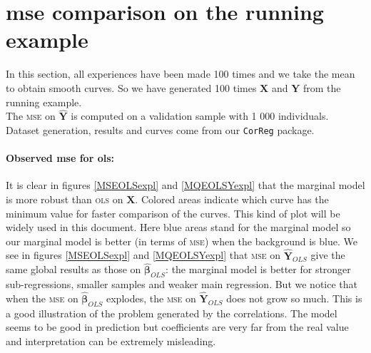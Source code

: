 \documentclass[12pt,a4paper]{report}
\begin{document}
	\section{{\sc mse} comparison on the running example}\label{MSEvraiS}
In this section, all experiences have been made 100 times and we take the mean to obtain smooth curves. So we have generated 100 times $\boldsymbol{X}$ and $\boldsymbol{Y}$ from the running example.\\	
	The \textsc{mse} on $\hat{\boldsymbol{Y}}$ is computed on a validation sample with 1 000 individuals.\\
	Dataset generation, results and curves come from our {\tt CorReg} package.
%
		\paragraph{Observed {\sc mse} for {\sc ols}:} It is clear in figures \ref{MSEOLSexpl} and \ref{MQEOLSYexpl} that the marginal model is more robust than \textsc{ols} on $\boldsymbol{X}$. Colored areas indicate which curve has the minimum value for faster comparison of the curves. This kind of plot will be widely used in this document. Here blue areas stand for the marginal model so our marginal model is better (in terms of \textsc{mse}) when the background is blue.
	We see in figures \ref{MSEOLSexpl} and \ref{MQEOLSYexpl} that \textsc{mse} on $\hat{\boldsymbol{Y}}_{OLS}$ give the same global results as those on $\hat{\boldsymbol{\beta}}_{OLS}$: the marginal model is better for stronger sub-regressions, smaller samples and weaker main regression. But we notice that when the \textsc{mse} on $\hat{\boldsymbol{\beta}}_{OLS}$ explodes, the \textsc{mse} on $\hat{\boldsymbol{Y}}_{OLS}$ does not grow so much. This is a good illustration of the problem generated by the correlations. The model seems to be good in prediction but coefficients are very far from the real value and interpretation can be extremely misleading.\\
	
\end{document}
